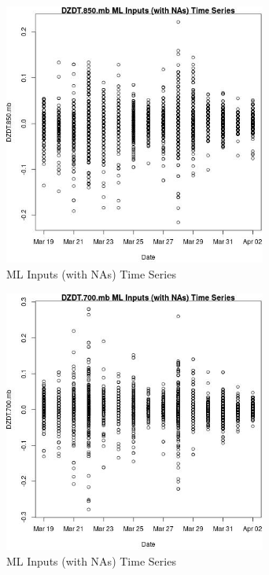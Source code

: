\clearpage 

\begin{figure} 
\centering  
\includegraphics[width=0.77\textwidth]{Code_Outputs/Report_ML_input_PM25_Step4_part_e_de_duplicated_aveswNAs_DZDT850mbvDate.jpg} 
\caption{\label{fig:Report_ML_input_PM25_Step4_part_e_de_duplicated_aveswNAsDZDT850mbvDate}ML Inputs (with NAs) Time Series} 
\end{figure} 
 

\begin{figure} 
\centering  
\includegraphics[width=0.77\textwidth]{Code_Outputs/Report_ML_input_PM25_Step4_part_e_de_duplicated_aveswNAs_DZDT700mbvDate.jpg} 
\caption{\label{fig:Report_ML_input_PM25_Step4_part_e_de_duplicated_aveswNAsDZDT700mbvDate}ML Inputs (with NAs) Time Series} 
\end{figure} 
 

